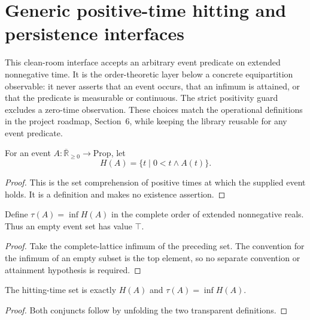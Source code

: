 
\chapter{Generic positive-time hitting and persistence interfaces}
\label{ch:ArchonPhysics_HittingTime}

This clean-room interface accepts an arbitrary event predicate on extended
nonnegative time.  It is the order-theoretic layer below a concrete
equipartition observable: it never asserts that an event occurs, that an
infimum is attained, or that the predicate is measurable or continuous.  The
strict positivity guard excludes a zero-time observation.  These choices match
the operational definitions in the project roadmap, Section~6, while keeping
the library reusable for any event predicate.

\begin{definition}
\label{def:hitting:times}
For an event $A:\overline{\mathbb R}_{\geq0}\to\mathrm{Prop}$, let
\[
  H(A)=\{t\mid 0<t\mathbin{\wedge}A(t)\}.
\]
\end{definition}
\begin{proof}

\leanok
This is the set comprehension of positive times at which the supplied event
holds.  It is a definition and makes no existence assertion.
\end{proof}

\begin{definition}
\label{def:hitting:first-time}
Define $\tau(A)=\inf H(A)$ in the complete order of extended nonnegative
reals.  Thus an empty event set has value $\top$.
\end{definition}
\begin{proof}

\leanok
Take the complete-lattice infimum of the preceding set.  The convention for
the infimum of an empty subset is the top element, so no separate convention
or attainment hypothesis is required.
\end{proof}

\begin{theorem}
\label{thm:hitting:spec}
The hitting-time set is exactly $H(A)$ and $\tau(A)=\inf H(A)$.
\end{theorem}
\begin{proof}

\leanok
Both conjuncts follow by unfolding the two transparent definitions.
\end{proof}

